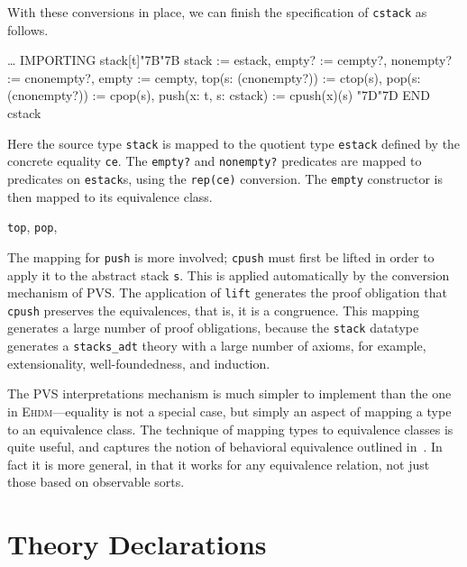 \documentclass[11pt,twoside,openright,titlepage]{cslreport}
\def\mapb{\char"7B\char"7B}
\def\mape{\char"7D\char"7D}
\begin{document}
With these conversions in place, we can finish the specification of
\texttt{cstack} as follows.
\begin{session}
  \ldots
  IMPORTING stack[t]\mapb{} stack := estack,
                       empty? := cempty?,
                       nonempty? := cnonempty?,
                       empty := cempty,
                       top(s: (cnonempty?)) := ctop(s),
                       pop(s: (cnonempty?)) := cpop(s),
                       push(x: t, s: cstack) := cpush(x)(s) \mape{}
 END cstack
\end{session}
\noindent Here the source type \texttt{stack} is mapped to the quotient
type \texttt{estack} defined by the concrete equality \texttt{ce}.  The
\texttt{empty?} and \texttt{nonempty?} predicates are mapped to predicates
on \texttt{estack}s, using the \texttt{rep(ce)} conversion.  The
\texttt{empty} constructor is then mapped to its equivalence class.

\texttt{top}, \texttt{pop},

The mapping for \texttt{push} is more involved; \texttt{cpush} must first
be lifted in order to apply it to the abstract stack \texttt{s}.  This is
applied automatically by the conversion mechanism of PVS.  The application
of \texttt{lift} generates the proof obligation that \texttt{cpush}
preserves the equivalences, that is, it is a congruence.  This mapping
generates a large number of proof obligations, because the \texttt{stack}
datatype generates a \texttt{stacks\_adt} theory with a large number of
axioms, for example, extensionality, well-foundedness, and induction.

The PVS interpretations mechanism is much simpler to implement than the
one in \textsc{Ehdm}---equality is not a special case, but simply an
aspect of mapping a type to an equivalence class.  The technique of
mapping types to equivalence classes is quite useful, and captures the
notion of behavioral equivalence outlined
in~\cite{SannellaDT:essential-concepts97}.  In fact it is more general, in
that it works for any equivalence relation, not just those based on
observable sorts.


\chapter{Theory Declarations}
\end{document}

